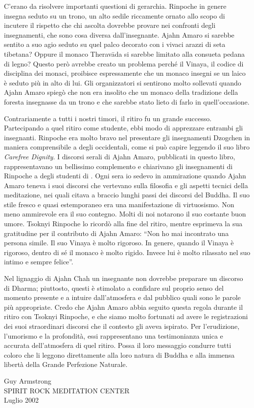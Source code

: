 C'erano da risolvere importanti questioni di gerarchia. Rinpoche in genere insegna seduto su un trono, un alto sedile riccamente ornato allo scopo di incutere il rispetto che chi ascolta dovrebbe provare nei confronti degli insegnamenti, che sono cosa diversa dall'insegnante. Ajahn Amaro si sarebbe sentito a suo agio seduto su quel palco decorato con i vivaci arazzi di seta tibetana? Oppure il monaco Theravāda si sarebbe limitato alla consueta pedana di legno? Questo però avrebbe creato un problema perché il Vinaya, il codice di disciplina dei monaci, proibisce espressamente che un monaco insegni se un laico è seduto più in alto di lui. Gli organizzatori si sentirono molto sollevati quando Ajahn Amaro spiegò che non era insolito che un monaco della tradizione della foresta insegnasse da un trono e che sarebbe stato lieto di farlo in quell'occasione. 

Contrariamente a tutti i nostri timori, il ritiro fu un grande successo. Partecipando a quel ritiro come studente, ebbi modo di apprezzare entrambi gli insegnanti. Rinpoche era molto bravo nel presentare gli insegnamenti Dzogchen in maniera comprensibile a degli occidentali, come si può capire leggendo il suo libro \textit{Carefree Dignity}. I discorsi serali di Ajahn Amaro, pubblicati in questo libro, rappresentavano un bellissimo complemento e chiarivano gli insegnamenti di Rinpoche a degli studenti di . Ogni sera io sedevo in ammirazione quando Ajahn Amaro teneva i suoi discorsi che vertevano sulla filosofia e gli aspetti tecnici della meditazione, nei quali citava a braccio lunghi passi dei discorsi del Buddha. Il suo stile fresco e quasi estemporaneo era una manifestazione di virtuosismo. Non meno ammirevole era il suo contegno. Molti di noi notarono il suo costante buon umore. Tsoknyi Rinpoche lo ricordò alla fine del ritiro, mentre esprimeva la sua gratitudine per il contributo di Ajahn Amaro: ``Non ho mai incontrato una persona simile. Il suo Vinaya è molto rigoroso. In genere, quando il Vinaya è rigoroso, dentro di sé il monaco è molto rigido. Invece lui è molto rilassato nel suo intimo e sempre felice''.

Nel lignaggio di Ajahn Chah un insegnante non dovrebbe preparare un discorso di Dharma; piuttosto, questi è stimolato a confidare sul proprio senso del momento presente e a intuire dall'atmosfera e dal pubblico quali sono le parole più appropriate. Credo che Ajahn Amaro abbia seguito questa regola durante il ritiro con Tsoknyi Rinpoche, e che siamo molto fortunati ad avere le registrazioni dei suoi straordinari discorsi che il contesto gli aveva ispirato. Per l'erudizione, l'umorismo e la profondità, essi rappresentano una testimonianza unica e accurata dell'atmosfera di quel ritiro. Possa il loro messaggio condurre tutti coloro che li leggono direttamente alla loro natura di Buddha e alla immensa libertà della Grande Perfezione Naturale.

\bigskip

{\raggedleft\par Guy Armstrong \\
SPIRIT ROCK MEDITATION CENTER \\
Luglio 2002 \par}
